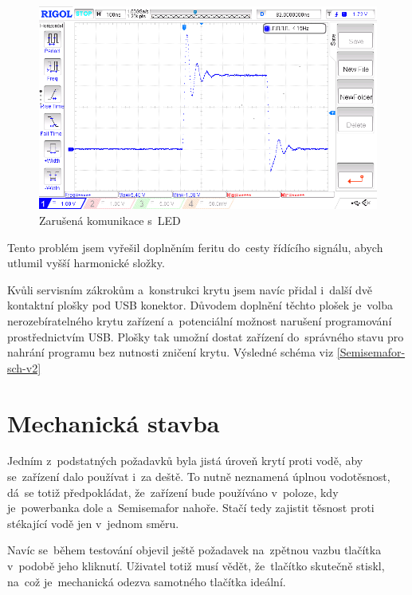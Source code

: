 \begin{figure}[!h]
  \begin{center}
    \includegraphics[width=\textwidth]{text/PraktickaCast/img/osci/fejk.png}
  \end{center}
  \caption{Zarušená komunikace s~LED}
  \label{Semisemafor-zvonek}
\end{figure}

Tento problém jsem vyřešil doplněním feritu do~cesty řídícího signálu, abych utlumil vyšší harmonické složky.

Kvůli servisním zákrokům a~konstrukci krytu jsem navíc přidal i~další dvě kontaktní plošky pod USB konektor.
Důvodem doplnění těchto plošek je~volba nerozebíratelného krytu zařízení a~potenciální možnost narušení programování prostřednictvím USB.
Plošky tak umožní dostat zařízení do~správného stavu pro nahrání programu bez nutnosti zničení krytu. 
Výsledné schéma viz \ref{Semisemafor-sch-v2}

\section{Mechanická stavba}
Jedním z~podstatných požadavků byla jistá úroveň krytí proti vodě, aby se~zařízení dalo používat i~za deště.
To nutně neznamená úplnou vodotěsnost, dá~se totiž předpokládat, že~zařízení bude používáno v~poloze, kdy je~powerbanka dole a~Semisemafor nahoře.
Stačí tedy zajistit těsnost proti stékající vodě jen v~jednom směru.

Navíc se~během testování objevil ještě požadavek na~zpětnou vazbu tlačítka v~podobě jeho kliknutí. 
Uživatel totiž musí vědět, že~tlačítko skutečně stiskl, na~což je~mechanická odezva samotného tlačítka ideální.

